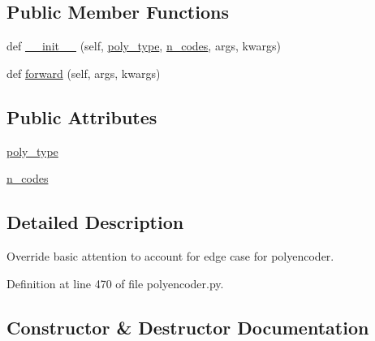 \subsection*{Public Member Functions}
\begin{DoxyCompactItemize}
\item 
def \hyperlink{classparlai_1_1agents_1_1transformer_1_1polyencoder_1_1PolyBasicAttention_a421bbb5dad363d0d16be9ab49b13a4e3}{\+\_\+\+\_\+init\+\_\+\+\_\+} (self, \hyperlink{classparlai_1_1agents_1_1transformer_1_1polyencoder_1_1PolyBasicAttention_aa82d4585cb9a4f671353565fcc0785ab}{poly\+\_\+type}, \hyperlink{classparlai_1_1agents_1_1transformer_1_1polyencoder_1_1PolyBasicAttention_a45603a52525744549d48b10e0bd1b63c}{n\+\_\+codes}, args, kwargs)
\item 
def \hyperlink{classparlai_1_1agents_1_1transformer_1_1polyencoder_1_1PolyBasicAttention_a6927374c5336d0111ab936c1fd2b62ff}{forward} (self, args, kwargs)
\end{DoxyCompactItemize}
\subsection*{Public Attributes}
\begin{DoxyCompactItemize}
\item 
\hyperlink{classparlai_1_1agents_1_1transformer_1_1polyencoder_1_1PolyBasicAttention_aa82d4585cb9a4f671353565fcc0785ab}{poly\+\_\+type}
\item 
\hyperlink{classparlai_1_1agents_1_1transformer_1_1polyencoder_1_1PolyBasicAttention_a45603a52525744549d48b10e0bd1b63c}{n\+\_\+codes}
\end{DoxyCompactItemize}


\subsection{Detailed Description}
\begin{DoxyVerb}Override basic attention to account for edge case for polyencoder.
\end{DoxyVerb}
 

Definition at line 470 of file polyencoder.\+py.



\subsection{Constructor \& Destructor Documentation}
\mbox{\label{classparlai_1_1agents_1_1transformer_1_1polyencoder_1_1PolyBasicAttention_a421bbb5dad363d0d16be9ab49b13a4e3}} 
